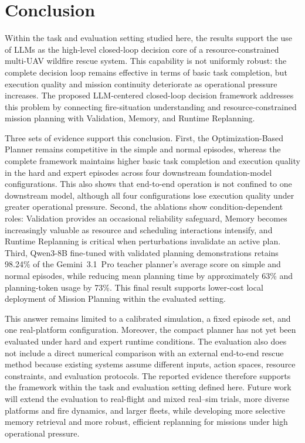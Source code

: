 \section{Conclusion}

Within the task and evaluation setting studied here, the results support the
use of LLMs as the high-level closed-loop decision core of a
resource-constrained multi-UAV wildfire rescue system. This capability is not
uniformly robust: the complete decision loop remains effective in terms of
basic task completion, but execution quality and mission continuity deteriorate
as operational pressure increases. The proposed LLM-centered closed-loop
decision framework addresses this problem by connecting fire-situation
understanding and resource-constrained mission planning with Validation,
Memory, and Runtime Replanning.

Three sets of evidence support this conclusion. First, the Optimization-Based
Planner remains competitive in the simple and normal episodes, whereas the
complete framework maintains higher basic task completion and execution quality
in the hard and expert episodes across four downstream foundation-model
configurations. This also shows that end-to-end operation is not confined to
one downstream model, although all four configurations lose execution quality
under greater operational pressure. Second, the ablations show condition-dependent
roles: Validation provides an occasional reliability safeguard, Memory becomes
increasingly valuable as resource and scheduling interactions intensify, and
Runtime Replanning is critical when perturbations invalidate an active plan.
Third, Qwen3-8B fine-tuned with validated planning demonstrations retains
98.24\% of the Gemini~3.1~Pro teacher planner's average score on simple and
normal episodes, while reducing mean planning time by approximately 63\% and
planning-token usage by 73\%. This final result supports lower-cost local
deployment of Mission Planning within the evaluated setting.

This answer remains limited to a calibrated simulation, a fixed
episode set, and one real-platform configuration. Moreover, the compact
planner has not yet been evaluated under hard and expert runtime conditions.
The evaluation also does not include a direct numerical comparison with an
external end-to-end rescue method because existing systems assume different
inputs, action spaces, resource constraints, and evaluation protocols. The
reported evidence therefore supports the framework within the task and
evaluation setting defined here. Future work will extend the evaluation to
real-flight and mixed real--sim trials, more diverse platforms and fire
dynamics, and larger fleets, while developing more selective memory retrieval
and more robust, efficient replanning for missions under high operational
pressure.

\endinput
